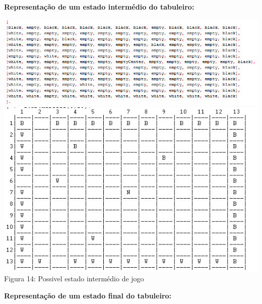 \documentclass[a4paper]{article}
\begin{document}
\textbf{Representação de um estado intermédio do tabuleiro:}
\begin{center}
\hspace*{-2cm}\includegraphics[scale=0.85]{gameex2rep.png}\linebreak\linebreak
 \includegraphics[scale=0.9]{gameex2.png}\linebreak
Figura 14: Possivel estado intermédio de jogo \linebreak\linebreak\newpage

\end{center}
\textbf{Representação de um estado final do tabuleiro:}
\end{document}
